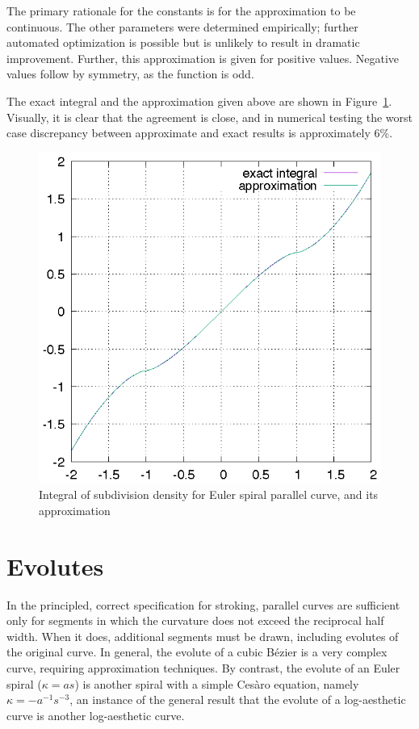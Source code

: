 \documentclass[format=acmsmall]{acmart}
\begin{document}
The primary rationale for the constants is for the approximation to be continuous. The other parameters were determined empirically; further automated optimization is possible but is unlikely to result in dramatic improvement. Further, this approximation is given for positive values. Negative values follow by symmetry, as the function is odd.

The exact integral and the approximation given above are shown in Figure~\ref{fig:espc}. Visually, it is clear that the agreement is close, and in numerical testing the worst case discrepancy between approximate and exact results is approximately 6\%.

\begin{figure}
    \includegraphics{espc}
    \caption{Integral of subdivision density for Euler spiral parallel curve, and its approximation}
    \label{fig:espc}
\end{figure}

\section{Evolutes}

In the principled, correct specification for stroking\cite{Nehab2020}, parallel curves are sufficient only for segments in which the curvature does not exceed the reciprocal half width. When it does, additional segments must be drawn, including evolutes of the original curve. In general, the evolute of a cubic Bézier is a very complex curve, requiring approximation techniques. By contrast, the evolute of an Euler spiral ($\kappa = as$) is another spiral with a simple Cesàro equation, namely $\kappa = -a^{-1}s^{-3}$, an instance of the general result that the evolute of a log-aesthetic curve is another log-aesthetic curve\cite{Yoshida2012}.
\end{document}
